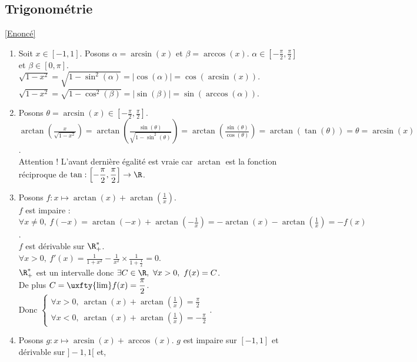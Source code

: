 \documentclass{book}
\begin{document}
	\subsection{Trigonométrie }
	\label{Trigonométrie corrigé}
	\textcolor{blue}{\hyperref[Trigonométrie]{[Enoncé]}}\\
	\begin{enumerate}[leftmargin=*]
		\item Soit $x\in [-1,1]$. Posons $\alpha=\arcsin(x)$ et $\beta=\arccos(x)$. $\alpha\in \displaystyle\left[-\frac{\pi}{2},\frac{\pi}{2}\right]$ et $\beta\in [0,\pi]$.\\
		$\sqrt{1-x^2}=\sqrt{1-\sin^2(\alpha)}=|\cos(\alpha)|=\cos(\arcsin(x))$.\\
		$\sqrt{1-x^2}=\sqrt{1-\cos^2(\beta)}=|\sin(\beta)|=\sin(\arccos(\alpha))$.
		\item Posons $\theta=\arcsin(x)\in \displaystyle\left[-\frac{\pi}{2},\frac{\pi}{2}\right]$.\\
		$\displaystyle\arctan\left(\frac{x}{\sqrt{1-x^2}}\right)=\arctan\left(\frac{\sin(\theta)}{\sqrt{1-\sin^2(\theta)}}\right)=\arctan\left(\frac{\sin(\theta)}{\cos(\theta)}\right)=\arctan(\tan(\theta))=\theta=\arcsin(x)$.\\
		Attention ! L'avant dernière égalité est vraie car $\arctan$ est la fonction réciproque de $\tan:\displaystyle\left[-\frac{\pi}{2},\frac{\pi}{2}\right]\to \R$.
		\item Posons $f:x\mapsto \arctan(x)+\arctan\left(\displaystyle\frac{1}{x}\right)$.\\
		$f$ est impaire : $\forall x\ne 0,\ f(-x)=\displaystyle\arctan(-x)+\arctan\left(-\frac{1}{x}\right)=-\arctan(x)-\arctan\left(\frac{1}{x}\right)=-f(x)$.\\
		$f$ est dérivable sur $\R^*_+$.\\
		$\forall x>0,\ \displaystyle f'(x)=\frac{1}{1+x^2}-\frac{1}{x^2}\times\frac{1}{1+\displaystyle\frac{1}{x}}=0$.\\
		$\R^*_+$ est un intervalle donc $\exists C\in \R,\ \forall x>0,\ f(x)=C$.\\
		De plus $C=\uxfty{\lim}f(x)=\displaystyle\frac{\pi}{2}$.\\
		Donc $\begin{cases}
			\forall x>0,\ \displaystyle\arctan(x)+\arctan\left(\frac{1}{x}\right)=\frac{\pi}{2}\\
			\forall x<0,\ \displaystyle\arctan(x)+\arctan\left(\frac{1}{x}\right)=-\frac{\pi}{2}
		\end{cases}$.
		\item Posons $g:x\mapsto\arcsin(x)+\arccos(x)$. $g$ est impaire sur $[-1,1]$ et dérivable sur $]-1,1[$ et,\\

\end{enumerate}
\end{document}
